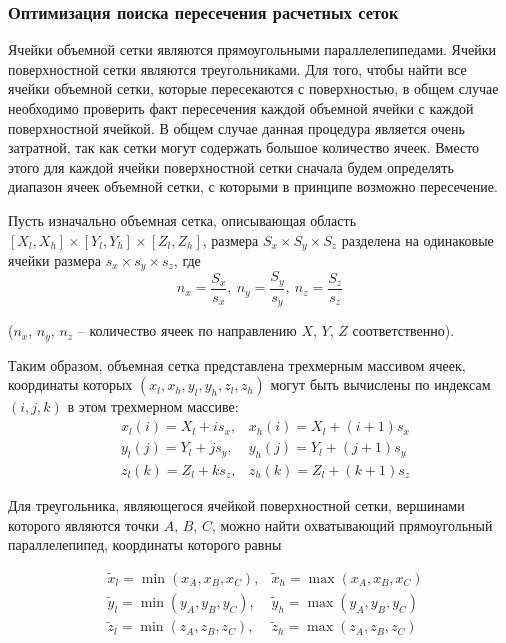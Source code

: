 \subsubsection{Оптимизация поиска пересечения расчетных сеток}

Ячейки объемной сетки являются прямоугольными параллелепипедами.
Ячейки поверхностной сетки являются треугольниками.
Для того, чтобы найти все ячейки объемной сетки, которые пересекаются с поверхностью, в общем случае необходимо проверить факт пересечения каждой объемной ячейки с каждой поверхностной ячейкой.
В общем случае данная процедура является очень затратной, так как сетки могут содержать большое количество ячеек.
Вместо этого для каждой ячейки поверхностной сетки сначала будем определять диапазон ячеек объемной сетки, с которыми в принципе возможно пересечение.

Пусть изначально объемная сетка, описывающая область $[X_l, X_h] \times [Y_l, Y_h] \times [Z_l, Z_h]$, размера $S_x \times S_y \times S_z$ разделена на одинаковые ячейки размера $s_x \times s_y \times s_z$, где
\begin{equation}
	n_x = \frac{S_x}{s_x}, \ n_y = \frac{S_y}{s_y}, \ n_z = \frac{S_z}{s_z}
\end{equation}

($n_x$, $n_y$, $n_z$ -- количество ячеек по направлению $X$, $Y$, $Z$ соответственно).

Таким образом, объемная сетка представлена трехмерным массивом ячеек, координаты которых $(x_l, x_h, y_l, y_h, z_l, z_h)$ могут быть вычислены по индексам $(i, j, k)$ в этом трехмерном массиве:
\begin{equation}
	\begin{aligned}
		& x_l(i) = X_l + i s_x, & x_h(i) = X_l + (i + 1) s_x \\
		& y_l(j) = Y_l + j s_y, & y_h(j) = Y_l + (j + 1) s_y \\
		& z_l(k) = Z_l + k s_z, & z_h(k) = Z_l + (k + 1) s_z		
	\end{aligned}
\end{equation}

Для треугольника, являющегося ячейкой поверхностной сетки, вершинами которого являются точки $A$, $B$, $C$, можно найти охватывающий прямоугольный параллелепипед, координаты которого равны

\begin{equation}
	\begin{aligned}
		& \tilde{x}_l = \min(x_A, x_B, x_C), & \tilde{x}_h = \max(x_A, x_B, x_C) \\
		& \tilde{y}_l = \min(y_A, y_B, y_C), & \tilde{y}_h = \max(y_A, y_B, y_C) \\
		& \tilde{z}_l = \min(z_A, z_B, z_C), & \tilde{z}_h = \max(z_A, z_B, z_C)
	\end{aligned}
\end{equation}


